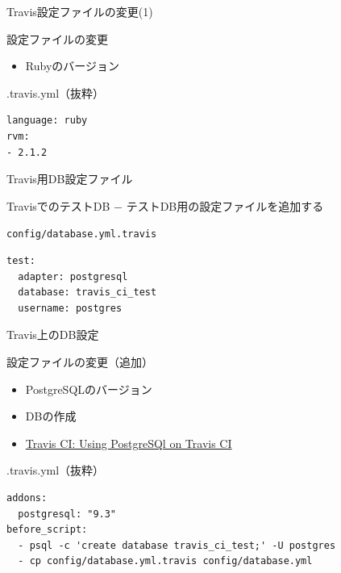 \documentclass[t, aspectratio=169]{beamer}
\begin{document}
\begin{frame}[fragile,label=sec-7-3-4]{Travis設定ファイルの変更(1)}
 \begin{block}{設定ファイルの変更}
\begin{itemize}
\item Rubyのバージョン
\end{itemize}
\end{block}

\begin{block}{.travis.yml（抜粋）}
\begin{verbatim}
language: ruby
rvm:
- 2.1.2
\end{verbatim}
\end{block}
\end{frame}

\begin{frame}[fragile,label=sec-7-3-5]{Travis用DB設定ファイル}
 \begin{block}{TravisでのテストDB}
− テストDB用の設定ファイルを追加する
\end{block}

\begin{block}{\texttt{config/database.yml.travis}}
\begin{verbatim}
test:
  adapter: postgresql
  database: travis_ci_test
  username: postgres
\end{verbatim}
\end{block}
\end{frame}
\begin{frame}[fragile,label=sec-7-3-6]{Travis上のDB設定}
 \begin{block}{設定ファイルの変更（追加）}
\begin{itemize}
\item PostgreSQLのバージョン
\item DBの作成
\item \href{http://docs.travis-ci.com/user/using-postgresql/}{Travis CI: Using PostgreSQl on Travis CI}
\end{itemize}
\end{block}
\begin{block}{.travis.yml（抜粋）}
\begin{verbatim}
addons:
  postgresql: "9.3"
before_script:
  - psql -c 'create database travis_ci_test;' -U postgres
  - cp config/database.yml.travis config/database.yml
\end{verbatim}
\end{block}
\end{frame}
\end{document}
